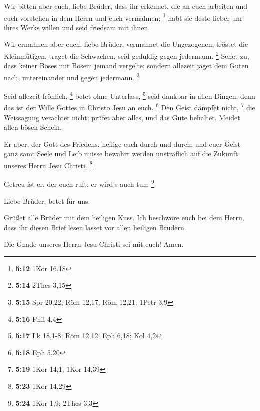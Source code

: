  Wir bitten aber euch, liebe Brüder, dass ihr erkennet,
die an euch arbeiten und euch vorstehen in dem Herrn und euch vermahnen;
\footnote{\textbf{5:12} 1Kor 16,18}  habt sie desto
lieber um ihres Werks willen und seid friedsam mit ihnen.

 Wir ermahnen aber euch, liebe Brüder, vermahnet die
Ungezogenen, tröstet die Kleinmütigen, traget die Schwachen, seid
geduldig gegen jedermann. \footnote{\textbf{5:14} 2Thes 3,15}
 Sehet zu, dass keiner Böses mit Bösem jemand vergelte;
sondern allezeit jaget dem Guten nach, untereinander und gegen
jedermann. \footnote{\textbf{5:15} Spr 20,22; Röm 12,17; Röm 12,21;
  1Petr 3,9}

 Seid allezeit fröhlich, \footnote{\textbf{5:16} Phil 4,4}
 betet ohne Unterlass, \footnote{\textbf{5:17} Lk 18,1-8;
  Röm 12,12; Eph 6,18; Kol 4,2}  seid dankbar in allen
Dingen; denn das ist der Wille Gottes in Christo Jesu an euch.
\footnote{\textbf{5:18} Eph 5,20}  Den Geist dämpfet
nicht, \footnote{\textbf{5:19} 1Kor 14,1; 1Kor 14,39} 
die Weissagung verachtet nicht;  prüfet aber alles, und
das Gute behaltet.  Meidet allen bösen Schein.

 Er aber, der Gott des Friedens, heilige euch durch und
durch, und euer Geist ganz samt Seele und Leib müsse bewahrt werden
unsträflich auf die Zukunft unseres Herrn Jesu Christi. \footnote{\textbf{5:23}
  1Kor 14,29}

 Getreu ist er, der euch ruft; er wird's auch tun.
\footnote{\textbf{5:24} 1Kor 1,9; 2Thes 3,3}

 Liebe Brüder, betet für uns.

 Grüßet alle Brüder mit dem heiligen Kuss.
 Ich beschwöre euch bei dem Herrn, dass ihr diesen Brief
lesen lasset vor allen heiligen Brüdern.

 Die Gnade unseres Herrn Jesu Christi sei mit euch! Amen.

